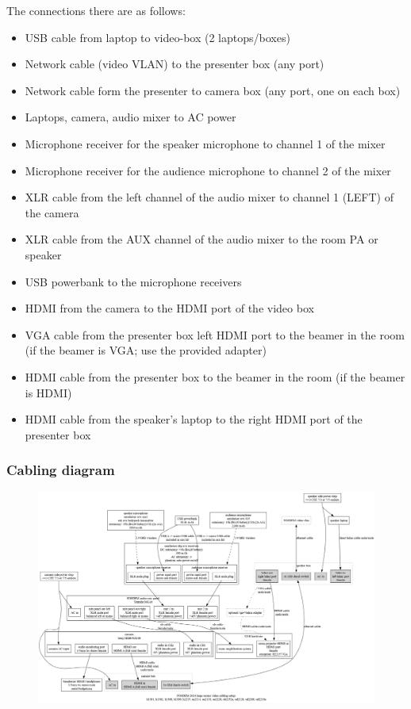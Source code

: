 \documentclass{article}
\begin{document}
The connections there are as follows:

\begin{itemize}
  \item USB cable from laptop to video-box (2 laptops/boxes)
  \item Network cable (video VLAN) to the presenter box (any port)
  \item Network cable form the presenter to camera box (any port, one on each box)
  \item Laptops, camera, audio mixer to AC power
  \item Microphone receiver for the speaker microphone to channel 1 of the mixer
  \item Microphone receiver for the audience microphone to channel 2 of the mixer
  \item XLR cable from the left channel of the audio mixer to channel 1 (LEFT) of the camera
  \item XLR cable from the AUX channel of the audio mixer to the room PA or speaker
  \item USB powerbank to the microphone receivers
  \item HDMI from the camera to the HDMI port of the video box
  \item VGA cable from the presenter box left HDMI port to the beamer in the room (if the beamer is VGA; use the provided adapter)
  \item HDMI cable from the presenter box to the beamer in the room (if the beamer is HDMI)
  \item HDMI cable from the speaker's laptop to the right HDMI port of the presenter box
\end{itemize}
\subsubsection{Cabling diagram}
\begin{figure}[H]
  \begin{sideways}
  \centering
  \includegraphics[width = 200mm]{../../graph/cabling_large_rooms.png}
  \end{sideways}
\end{figure}
\end{document}
